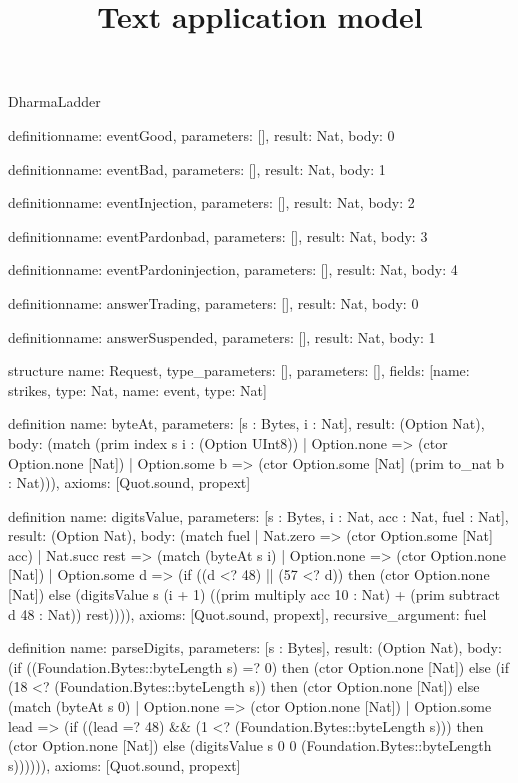 \begin{lexlean}{DharmaLadder}
\title{Text application model}
\begin{semanticmodule}
definition{name: eventGood, parameters: [], result: Nat, body: 0}

definition{name: eventBad, parameters: [], result: Nat, body: 1}

definition{name: eventInjection, parameters: [], result: Nat, body: 2}

definition{name: eventPardonbad, parameters: [], result: Nat, body: 3}

definition{name: eventPardoninjection, parameters: [], result: Nat, body: 4}

definition{name: answerTrading, parameters: [], result: Nat, body: 0}

definition{name: answerSuspended, parameters: [], result: Nat, body: 1}

structure{
  name: Request,
  type_parameters: [],
  parameters: [],
  fields: [{name: strikes, type: Nat}, {name: event, type: Nat}]
}

definition{
  name: byteAt,
  parameters: [s : Bytes, i : Nat],
  result: (Option Nat),
  body: (match (prim index s i : (Option UInt8))
    | Option.none => (ctor Option.none [Nat])
    | Option.some b => (ctor Option.some [Nat] (prim to_nat b : Nat))),
  axioms: [Quot.sound, propext]
}

definition{
  name: digitsValue,
  parameters: [s : Bytes, i : Nat, acc : Nat, fuel : Nat],
  result: (Option Nat),
  body: (match fuel
    | Nat.zero => (ctor Option.some [Nat] acc)
    | Nat.succ rest => (match (byteAt s i)
      | Option.none => (ctor Option.none [Nat])
      | Option.some d => (if ((d <? 48) || (57 <? d)) then (ctor Option.none [Nat]) else (digitsValue s (i + 1) ((prim multiply acc 10 : Nat) + (prim subtract d 48 : Nat)) rest)))),
  axioms: [Quot.sound, propext],
  recursive_argument: fuel
}

definition{
  name: parseDigits,
  parameters: [s : Bytes],
  result: (Option Nat),
  body: (if ((Foundation.Bytes::byteLength s) =? 0) then (ctor Option.none [Nat]) else (if (18 <? (Foundation.Bytes::byteLength s)) then (ctor Option.none [Nat]) else (match (byteAt s 0)
    | Option.none => (ctor Option.none [Nat])
    | Option.some lead => (if ((lead =? 48) && (1 <? (Foundation.Bytes::byteLength s))) then (ctor Option.none [Nat]) else (digitsValue s 0 0 (Foundation.Bytes::byteLength s)))))),
  axioms: [Quot.sound, propext]
}


\end{semanticmodule}
\end{lexlean}
